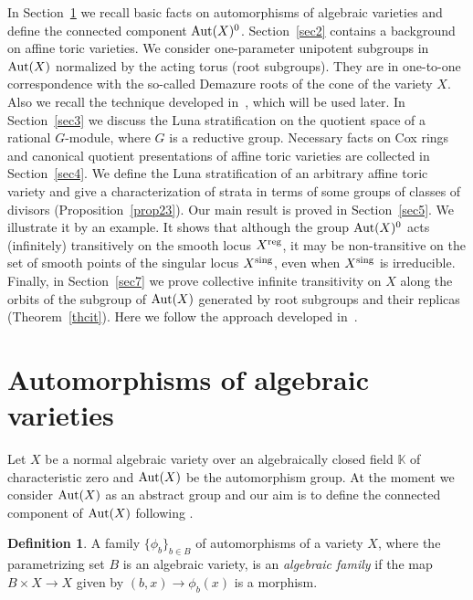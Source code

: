 \documentclass[12pt,a4paper]{amsart}
\theoremstyle{plain}
\theoremstyle{definition}
\newtheorem{definition}{Definition}
\begin{document}
In Section~\ref{sec1} we recall basic facts on automorphisms of algebraic varieties and define the connected component ${\mathop{\rm Aut}}(X)^0$. Section~\ref{sec2} contains a background on affine toric varieties. We consider
one-parameter unipotent subgroups in ${\mathop{\rm Aut}}(X)$ normalized by the acting torus (root subgroups).
They are in one-to-one correspondence with the so-called Demazure roots of the cone of the
variety $X$. Also we recall the technique developed in~\cite{AKZ}, which will be used later.
In Section~\ref{sec3} we discuss the Luna stratification on the quotient space of a rational
$G$-module, where $G$ is a reductive group. Necessary facts on Cox rings and canonical quotient
presentations of affine toric varieties are collected in Section~\ref{sec4}. We define the
Luna stratification of an arbitrary affine toric variety and give a characterization
of strata in terms of some groups of classes of divisors (Proposition~\ref{prop23}).
Our main result is proved in Section~\ref{sec5}. We illustrate it by an example. It
shows that although the group ${\mathop{\rm Aut}}(X)^0$ acts (infinitely)
transitively on the smooth locus $X^{\mathop{\rm reg}}$, it may be non-transitive
on the set of smooth points of the singular locus $X^{\mathop{\rm sing}}$, even when $X^{\mathop{\rm sing}}$
is irreducible. Finally, in Section~\ref{sec7} we prove collective infinite
transitivity on $X$ along the orbits of the subgroup of ${\mathop{\rm Aut}}(X)$ generated by
root subgroups and their replicas (Theorem~\ref{thcit}). Here we follow the approach developed in~\cite{AFKKZ}.

\section{Automorphisms of algebraic varieties}
\label{sec1}

Let $X$ be a normal algebraic variety over an algebraically closed
field ${{\mathbb K}}$ of characteristic zero and ${\mathop{\rm Aut}}(X)$ be the automorphism group.
At the moment we consider ${\mathop{\rm Aut}}(X)$ as an abstract group and our aim
is to define the connected component of ${\mathop{\rm Aut}}(X)$ following \cite{Ra}.

\begin{definition}
A family $\{\phi_b\}_{b\in B}$ of automorphisms of a variety $X$, where
the parametrizing set $B$ is an algebraic variety, is an {\it algebraic family}
if the map $B\times X \to X$ given by $(b,x)\to\phi_b(x)$ is a morphism.
\end{definition}
\end{document}

